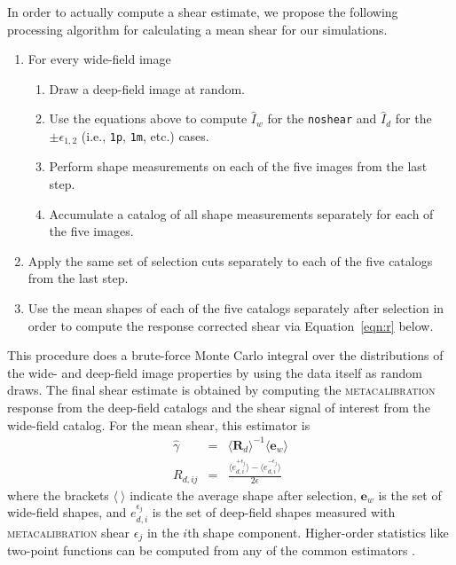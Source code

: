 \documentclass[twocolumn]{openjournal}
\makeatletter
\newcommand{\mcal}{\textsc{metacalibration}\@\xspace}
\newcommand{\noshear}{\texttt{noshear}\@\xspace}
\makeatother
\begin{document}
In order to actually compute a shear estimate, we propose the following processing
algorithm for calculating a mean shear for our simulations.
\begin{enumerate}
\item For every wide-field image
\begin{enumerate}
  \item Draw a deep-field image at random.
  \item Use the equations above to compute $\hat I_{w}$ for the \noshear
    and $\hat I_{d}$ for the $\pm\epsilon_{1,2}$ (i.e., \texttt{1p}, \texttt{1m}, etc.)
    cases.
  \item Perform shape measurements on each of the five images from the last step.
  \item Accumulate a catalog of all shape measurements separately for each of the
    five images.
\end{enumerate}
\item Apply the same set of selection cuts separately to each of the five catalogs from
  the last step.
\item Use the mean shapes of each of the five catalogs separately after selection in
  order to compute the response corrected shear via Equation~\ref{eqn:r} below.
\end{enumerate}
This procedure does a brute-force Monte Carlo integral over the
distributions of the wide- and deep-field image properties by using the data itself as
random draws. The final shear estimate is obtained by computing the \mcal response from the deep-field
catalogs and the shear signal of interest from the wide-field catalog. For the mean
shear, this estimator is
\begin{eqnarray}\label{eqn:r}
\hat\gamma & = & \langle\mathbf{R}_d\rangle^{-1} \langle\mathbf{e}_{w}\rangle\\
R_{d,ij} & = & \frac{\langle e^{+\epsilon_j}_{d,i}\rangle - \langle e^{-\epsilon_j}_{d,i}\rangle}{2\epsilon}\nonumber
\end{eqnarray}
where the brackets $\langle\ \rangle$ indicate the average shape after selection,
$\mathbf{e}_{w}$ is the set of wide-field shapes, and $e^{\epsilon_j}_{d,i}$ is the set
of deep-field shapes measured  with \mcal shear $\epsilon_j$ in the $i$th shape
component. Higher-order statistics like two-point functions can be computed from
any of the common estimators \citep[see, e.g.,][for examples]{desy3shear}.
\end{document}
